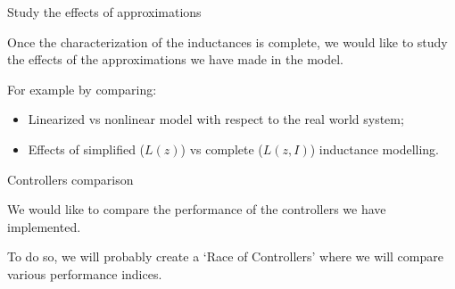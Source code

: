 \begin{frame}{Study the effects of approximations}

    Once the characterization of the inductances is complete, we would like to study the effects of the approximations we have made in the model.

    \vspace{9pt}

    For example by comparing:

    \begin{itemize}
        \item Linearized vs nonlinear model with respect to the real world system;
        \item Effects of simplified ($L(z)$) vs complete ($L(z, I)$) inductance modelling.
    \end{itemize}

\end{frame}



\begin{frame}{Controllers comparison}

    We would like to compare the performance of the controllers we have implemented.

    \vspace{9pt}

    To do so, we will probably create a `Race of Controllers\footnotemark[1]' where we will compare various performance indices.


\end{frame}